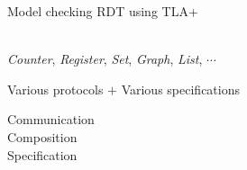 
\begin{frame}{}
  \begin{center}
    {\large {} Model checking RDT using TLA+} \\[5pt]

     \\[20pt] \pause

    \textsl{Counter}, \textsl{Register}, \textsl{Set}, \textsl{Graph}, \textsl{List}, $\cdots$ \\[20pt] \pause

    Various protocols $+$ Various specifications
  \end{center}
\end{frame}

\begin{frame}{}
  \centerline{}


  \pause
  \begin{center}
    Communication \\[6pt]
    Composition  \\[6pt]
    Specification 
  \end{center}
\end{frame}
